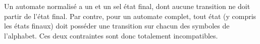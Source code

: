 \begin{corrections}
\begin{questions}
\begin{center}
\begin{tikzpicture}[automaton, size=20mm]
      \end{tikzpicture}
    \end{center}
  \item Un automate normalisé a un et un sel état final, dont aucune transition ne doit partir de l'état final.
    Par contre, pour un automate complet, tout état (y compris les états finaux) doit posséder une transition sur chacun des symboles de l'alphabet. 
    Ces deux contraintes sont donc totalement incompatibles.
  \end{questions}

\end{corrections}

\endgroup
\endinput
